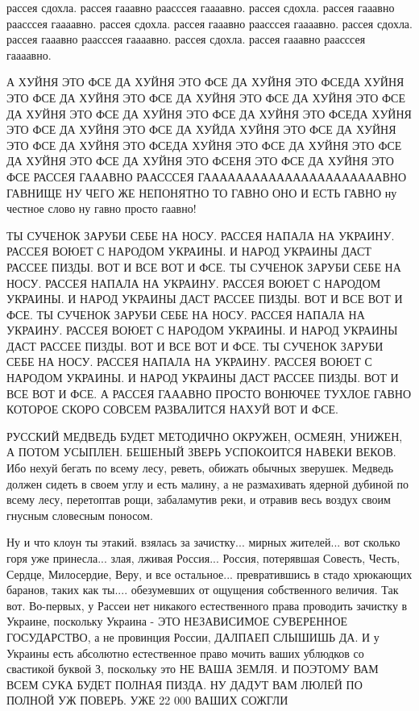 рассея сдохла. рассея гааавно раасссея гаааавно. рассея сдохла. рассея гааавно
раасссея гаааавно. рассея сдохла. рассея гааавно раасссея гаааавно. рассея
сдохла. рассея гааавно раасссея гаааавно. рассея сдохла. рассея гааавно
раасссея гаааавно.

А ХУЙНЯ ЭТО ФСЕ ДА ХУЙНЯ ЭТО ФСЕ ДА ХУЙНЯ ЭТО ФСЕДА ХУЙНЯ ЭТО ФСЕ ДА ХУЙНЯ ЭТО ФСЕ ДА ХУЙНЯ ЭТО ФСЕ ДА ХУЙНЯ ЭТО ФСЕ ДА ХУЙНЯ ЭТО ФСЕ ДА ХУЙНЯ ЭТО ФСЕ ДА ХУЙНЯ ЭТО ФСЕДА ХУЙНЯ ЭТО ФСЕ ДА ХУЙНЯ ЭТО ФСЕ ДА ХУЙДА ХУЙНЯ ЭТО ФСЕ ДА ХУЙНЯ ЭТО ФСЕ ДА ХУЙНЯ ЭТО ФСЕДА ХУЙНЯ ЭТО ФСЕ ДА ХУЙНЯ ЭТО ФСЕ ДА ХУЙНЯ ЭТО ФСЕ ДА ХУЙНЯ ЭТО ФСЕНЯ ЭТО ФСЕ ДА ХУЙНЯ ЭТО ФСЕ РАССЕЯ ГАААВНО РААСССЕЯ ГААААААААААААААААААААААВНО ГАВНИЩЕ НУ ЧЕГО ЖЕ НЕПОНЯТНО ТО ГАВНО ОНО И ЕСТЬ ГАВНО ну честное слово ну гавно просто гаавно!

ТЫ СУЧЕНОК ЗАРУБИ СЕБЕ НА НОСУ. РАССЕЯ НАПАЛА НА УКРАИНУ. РАССЕЯ ВОЮЕТ С НАРОДОМ УКРАИНЫ. И НАРОД УКРАИНЫ ДАСТ РАССЕЕ ПИЗДЫ. ВОТ И ВСЕ ВОТ И ФСЕ. 
ТЫ СУЧЕНОК ЗАРУБИ СЕБЕ НА НОСУ. РАССЕЯ НАПАЛА НА УКРАИНУ. РАССЕЯ ВОЮЕТ С НАРОДОМ УКРАИНЫ. И НАРОД УКРАИНЫ ДАСТ РАССЕЕ ПИЗДЫ. ВОТ И ВСЕ ВОТ И ФСЕ. 
ТЫ СУЧЕНОК ЗАРУБИ СЕБЕ НА НОСУ. РАССЕЯ НАПАЛА НА УКРАИНУ. РАССЕЯ ВОЮЕТ С НАРОДОМ УКРАИНЫ. И НАРОД УКРАИНЫ ДАСТ РАССЕЕ ПИЗДЫ. ВОТ И ВСЕ ВОТ И ФСЕ. 
ТЫ СУЧЕНОК ЗАРУБИ СЕБЕ НА НОСУ. РАССЕЯ НАПАЛА НА УКРАИНУ. РАССЕЯ ВОЮЕТ С НАРОДОМ УКРАИНЫ. И НАРОД УКРАИНЫ ДАСТ РАССЕЕ ПИЗДЫ. ВОТ И ВСЕ ВОТ И ФСЕ. 
А РАССЕЯ ГАААВНО ПРОСТО ВОНЮЧЕЕ ТУХЛОЕ ГАВНО КОТОРОЕ СКОРО СОВСЕМ РАЗВАЛИТСЯ НАХУЙ ВОТ И ФСЕ.

РУССКИЙ МЕДВЕДЬ БУДЕТ МЕТОДИЧНО ОКРУЖЕН, ОСМЕЯН, УНИЖЕН, А ПОТОМ УСЫПЛЕН.
БЕШЕНЫЙ ЗВЕРЬ УСПОКОИТСЯ НАВЕКИ ВЕКОВ. Ибо нехуй бегать по всему лесу, реветь,
обижать обычных зверушек. Медведь должен сидеть в своем углу и есть малину, а
не размахивать ядерной дубиной по всему лесу, перетоптав рощи, забаламутив
реки, и отравив весь воздух своим гнусным словесным поносом.


Ну и что клоун ты этакий. взялась за зачистку... мирных жителей... вот сколько
горя уже принесла... злая, лживая Россия... Россия, потерявшая Совесть, Честь,
Сердце, Милосердие, Веру, и все остальное... превратившись в стадо хрюкающих
баранов, таких как ты.... обезумевших от ощущения собственного величия. Так
вот. Во-первых, у Рассеи нет никакого естественного права проводить зачистку в
Украине, поскольку Украина - ЭТО НЕЗАВИСИМОЕ СУВЕРЕННОЕ ГОСУДАРСТВО, а не
провинция России, ДАЛПАЕП СЛЫШИШЬ ДА. И у Украины есть абсолютно естественное
право мочить ваших ублюдков со свастикой буквой З, поскольку это НЕ ВАША ЗЕМЛЯ.
И ПОЭТОМУ ВАМ ВСЕМ СУКА БУДЕТ ПОЛНАЯ ПИЗДА. НУ ДАДУТ ВАМ ЛЮЛЕЙ ПО ПОЛНОЙ УЖ
ПОВЕРЬ. УЖЕ 22 000 ВАШИХ СОЖГЛИ

